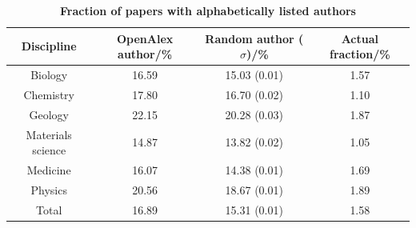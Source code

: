 \clearpage
\newpage
\begin{table}[ht]
\caption{\textbf{Fraction of papers with alphabetically listed authors}}
\centering
\begin{tabular}{cccc}
\hline
Discipline        & OpenAlex author/\% & Random author ($\sigma$)/\% & Actual fraction/\% \\ \hline
Biology           & 16.59 & 15.03 (0.01) & 1.57  \\
Chemistry         & 17.80 & 16.70 (0.02) & 1.10  \\
Geology           & 22.15 & 20.28 (0.03) & 1.87  \\
Materials science & 14.87 & 13.82 (0.02) & 1.05 \\
Medicine          & 16.07 & 14.38 (0.01) & 1.69  \\
Physics           & 20.56 & 18.67 (0.01) & 1.89  \\ \hline
Total             & 16.89 & 15.31 (0.01) & 1.58  \\ \hline
\end{tabular}
\label{tab12}
\end{table}